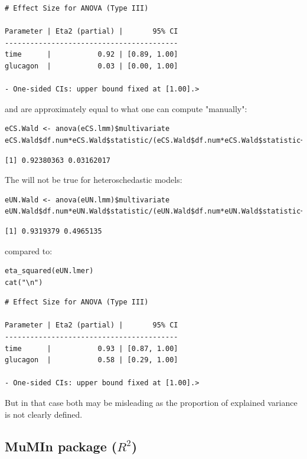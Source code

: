 \documentclass[12pt]{article}
\begin{document}
\begin{verbatim}
# Effect Size for ANOVA (Type III)

Parameter | Eta2 (partial) |       95% CI
-----------------------------------------
time      |           0.92 | [0.89, 1.00]
glucagon  |           0.03 | [0.00, 1.00]

- One-sided CIs: upper bound fixed at [1.00].>
\end{verbatim}


and are approximately equal to what one can compute "manually":
\lstset{language=r,label= ,caption= ,captionpos=b,numbers=none}
\begin{lstlisting}
eCS.Wald <- anova(eCS.lmm)$multivariate
eCS.Wald$df.num*eCS.Wald$statistic/(eCS.Wald$df.num*eCS.Wald$statistic+eCS.Wald$df.denom)
\end{lstlisting}

\begin{verbatim}
[1] 0.92380363 0.03162017
\end{verbatim}


The will not be true for heteroschedastic models:
\lstset{language=r,label= ,caption= ,captionpos=b,numbers=none}
\begin{lstlisting}
eUN.Wald <- anova(eUN.lmm)$multivariate
eUN.Wald$df.num*eUN.Wald$statistic/(eUN.Wald$df.num*eUN.Wald$statistic+eUN.Wald$df.denom)
\end{lstlisting}

\begin{verbatim}
[1] 0.9319379 0.4965135
\end{verbatim}


compared to:
\lstset{language=r,label= ,caption= ,captionpos=b,numbers=none}
\begin{lstlisting}
eta_squared(eUN.lmer)
cat("\n")
\end{lstlisting}

\begin{verbatim}
# Effect Size for ANOVA (Type III)

Parameter | Eta2 (partial) |       95% CI
-----------------------------------------
time      |           0.93 | [0.87, 1.00]
glucagon  |           0.58 | [0.29, 1.00]

- One-sided CIs: upper bound fixed at [1.00].>
\end{verbatim}


But in that case both may be misleading as the proportion of explained
variance is not clearly defined.

\subsection{MuMIn package (\(R^2\))}
\label{sec:org4ba274f}
\end{document}
